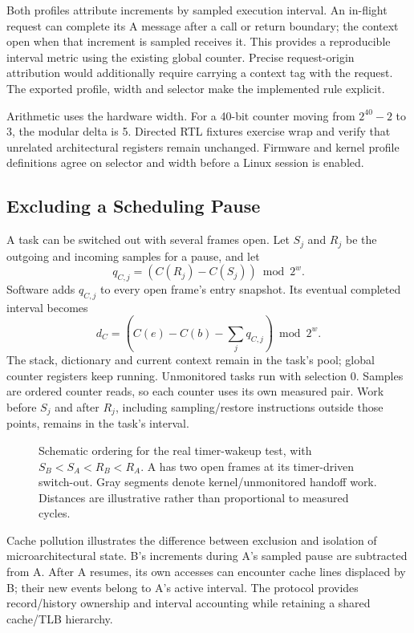 Both profiles attribute increments by sampled execution interval. An in-flight request can complete its A message after a call or return boundary; the context open when that increment is sampled receives it. This provides a reproducible interval metric using the existing global counter. Precise request-origin attribution would additionally require carrying a context tag with the request. The exported profile, width and selector make the implemented rule explicit.

Arithmetic uses the hardware width. For a 40-bit counter moving from $2^{40}-2$ to 3, the modular delta is 5. Directed RTL fixtures exercise wrap and verify that unrelated architectural registers remain unchanged. Firmware and kernel profile definitions agree on selector and width before a Linux session is enabled.

\subsection{Excluding a Scheduling Pause}
A task can be switched out with several frames open. Let $S_j$ and $R_j$ be the outgoing and incoming samples for a pause, and let
\begin{equation}
 q_{C,j}=(C(R_j)-C(S_j))\bmod 2^w.
\end{equation}
Software adds $q_{C,j}$ to every open frame's entry snapshot. Its eventual completed interval becomes
\begin{equation}
 d_C=\left(C(e)-C(b)-\sum_j q_{C,j}\right)\bmod 2^w.
\label{eq:rebase}
\end{equation}
The stack, dictionary and current context remain in the task's pool; global counter registers keep running. Unmonitored tasks run with selection 0. Samples are ordered counter reads, so each counter uses its own measured pair. Work before $S_j$ and after $R_j$, including sampling/restore instructions outside those points, remains in the task's interval.

\begin{figure}[t]
\centering
\caption{Schematic ordering for the real timer-wakeup test, with $S_B<S_A<R_B<R_A$. A has two open frames at its timer-driven switch-out. Gray segments denote kernel/unmonitored handoff work. Distances are illustrative rather than proportional to measured cycles.}
\label{fig:scheduling}
\end{figure}

Cache pollution illustrates the difference between exclusion and isolation of microarchitectural state. B's increments during A's sampled pause are subtracted from A. After A resumes, its own accesses can encounter cache lines displaced by B; their new events belong to A's active interval. The protocol provides record/history ownership and interval accounting while retaining a shared cache/TLB hierarchy.

